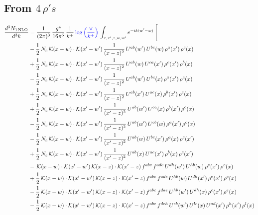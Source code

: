 \documentclass[9pt]{article}
\numberwithin{equation}{section}
\begin{document}
\subsection{From $4\, \rho's$}
\begin{align}
\frac{d^{3}N_{1\,\mathrm{NLO}}}{d^{3}k} & = \frac{1}{(2\pi)^{3}}\,\frac{g^{4}}{16\pi^{5}}\,\frac{1}{k^{+}}\,{\color{blue}\log{\left(\frac{\vee}{k^{+}}\right)}}\,\int_{x,x',z,w,w'}e^{-ik(w'-w)}\,\Bigg[\notag\\ & -\frac{1}{2}\,N_{c}\,\mathcal{K}(x-w)\cdot\mathcal{K}(x'-w')\,\frac{1}{(x-z)^{2}}\,U^{ab}(w')\,U^{bc}(w)\,\rho^{a}(x')\,\rho^{c}(x)\notag\\
& +\frac{1}{2}\,N_{c}\,\mathcal{K}(x-w)\cdot\mathcal{K}(x'-w')\,\frac{1}{(x-z)^{2}}\,U^{ab}(w)\,U^{ca}(x')\,\rho^{c}(x')\,\rho^{b}(x)\notag\\
& -\frac{1}{2}\,N_{c}\,\mathcal{K}(x-w)\cdot\mathcal{K}(x'-w')\,\frac{1}{(x-z)^{2}}\,U^{ab}(w')\,U^{bc}(x)\,\rho^{a}(x')\,\rho^{c}(x)\notag\\
& +\frac{1}{2}\,N_{c}\,\mathcal{K}(x-w)\cdot\mathcal{K}(x'-w')\,\frac{1}{(x-z)^{2}}\,U^{ab}(x')\,U^{ac}(x)\,\rho^{b}(x')\,\rho^{c}(x)\notag\\
& +\frac{1}{2}\,N_{c}\,\mathcal{K}(x-w)\cdot\mathcal{K}(x'-w')\,\frac{1}{(x'-z)^{2}}\,U^{ab}(w')\,U^{ca}(x)\,\rho^{b}(x')\,\rho^{c}(x)\notag\\
& -\frac{1}{2}\,N_{c}\,\mathcal{K}(x-w)\cdot\mathcal{K}(x'-w')\,\frac{1}{(x'-z)^{2}}\,U^{ab}(w')\,U^{cb}(w)\,\rho^{a}(x')\,\rho^{c}(x)\notag\\
& -\frac{1}{2}\,N_{c}\,\mathcal{K}(x-w)\cdot\mathcal{K}(x'-w')\,\frac{1}{(x'-z)^{2}}\,U^{ab}(w)\,U^{bc}(x')\,\rho^{a}(x)\,\rho^{c}(x')\notag\\
& +\frac{1}{2}\,N_{c}\,\mathcal{K}(x-w)\cdot\mathcal{K}(x'-w')\,\frac{1}{(x'-z)^{2}}\,U^{ab}(x)\,U^{ac}(x')\,\rho^{b}(x)\,\rho^{c}(x')\notag\\
& -\,\mathcal{K}(x-w)\cdot\mathcal{K}(x'-w')\,\mathcal{K}(x-z)\cdot\mathcal{K}(x'-z)\,f^{abc}\,f^{ade}\,U^{dh}(w')\,U^{hb}(w)\,\rho^{e}(x')\,\rho^{c}(x)\notag\\
& +\frac{1}{2}\,\mathcal{K}(x-w)\cdot\mathcal{K}(x'-w')\,\mathcal{K}(x-z)\cdot\mathcal{K}(x'-z)\,f^{abc}\,f^{ade}\,U^{hb}(w)\,U^{dh}(x')\,\rho^{e}(x')\,\rho^{c}(x)\notag\\
& -\frac{1}{2}\,\mathcal{K}(x-w)\cdot\mathcal{K}(x'-w')\,\mathcal{K}(x-z)\cdot\mathcal{K}(x'-z)\,f^{abc}\,f^{dae}\,U^{hb}(w')\,U^{dh}(x)\,\rho^{c}(x')\,\rho^{e}(x)\notag\\
& -\frac{1}{2}\,\mathcal{K}(x-w)\cdot\mathcal{K}(x'-w')\,\mathcal{K}(x-z)\cdot\mathcal{K}(x'-z)\,f^{abc}\,f^{deh}\,U^{eb}(w')\,U^{lc}(x)\,U^{ad}(x')\,\rho^{h}(x')\,\rho^{l}(x)\notag\\

\end{align}
\end{document}
